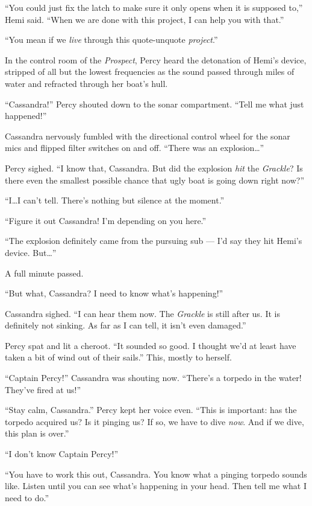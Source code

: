 \documentclass[
]{scrbook}
\begin{document}
``You could just fix the latch to make sure it only opens when it is
supposed to,'' Hemi said. ``When we are done with this project, I can
help you with that.''

``You mean if we \emph{live} through this quote-unquote
\emph{project}.''

\bigskip

In the control room of the \emph{Prospect}, Percy heard the detonation
of Hemi's device, stripped of all but the lowest frequencies as the
sound passed through miles of water and refracted through her boat's
hull.

``Cassandra!'' Percy shouted down to the sonar compartment. ``Tell me
what just happened!''

Cassandra nervously fumbled with the directional control wheel for the
sonar mics and flipped filter switches on and off. ``There was an
explosion\ldots{}''

Percy sighed. ``I know that, Cassandra. But did the explosion \emph{hit}
the \emph{Grackle}? Is there even the smallest possible chance that ugly
boat is going down right now?''

``I\ldots I can't tell. There's nothing but silence at the moment.''

``Figure it out Cassandra! I'm depending on you here.''

``The explosion definitely came from the pursuing sub --- I'd say they
hit Hemi's device. But\ldots{}''

A full minute passed.

``But what, Cassandra? I need to know what's happening!''

Cassandra sighed. ``I can hear them now. The \emph{Grackle} is still
after us. It is definitely not sinking. As far as I can tell, it isn't
even damaged.''

Percy spat and lit a cheroot. ``It sounded so good. I thought we'd at
least have taken a bit of wind out of their sails.'' This, mostly to
herself.

``Captain Percy!'' Cassandra was shouting now. ``There's a torpedo in
the water! They've fired at us!''

``Stay calm, Cassandra.'' Percy kept her voice even. ``This is
important: has the torpedo acquired us? Is it pinging us? If so, we have
to dive \emph{now}. And if we dive, this plan is over.''

``I don't know Captain Percy!''

``You have to work this out, Cassandra. You know what a pinging torpedo
sounds like. Listen until you can see what's happening in your head.
Then tell me what I need to do.''
\end{document}
